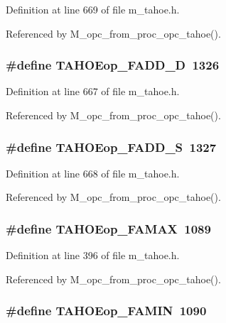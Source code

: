 Definition at line 669 of file m\_\-tahoe.h.

Referenced by M\_\-opc\_\-from\_\-proc\_\-opc\_\-tahoe().
\subsubsection{\setlength{\rightskip}{0pt plus 5cm}\#define TAHOEop\_\-FADD\_\-D~1326}\label{m__tahoe_8h_241a8747d75d2d645541d0539a2fd7b4}




Definition at line 667 of file m\_\-tahoe.h.

Referenced by M\_\-opc\_\-from\_\-proc\_\-opc\_\-tahoe().
\subsubsection{\setlength{\rightskip}{0pt plus 5cm}\#define TAHOEop\_\-FADD\_\-S~1327}\label{m__tahoe_8h_b6dfefc976f8f69bf2d8ab731462d5c6}




Definition at line 668 of file m\_\-tahoe.h.

Referenced by M\_\-opc\_\-from\_\-proc\_\-opc\_\-tahoe().
\subsubsection{\setlength{\rightskip}{0pt plus 5cm}\#define TAHOEop\_\-FAMAX~1089}\label{m__tahoe_8h_14d2e8075cdb7a041bd5fdcc7e01e81c}




Definition at line 396 of file m\_\-tahoe.h.

Referenced by M\_\-opc\_\-from\_\-proc\_\-opc\_\-tahoe().
\subsubsection{\setlength{\rightskip}{0pt plus 5cm}\#define TAHOEop\_\-FAMIN~1090}\label{m__tahoe_8h_01649e94adf1090fba1e2070d82d68b3}




